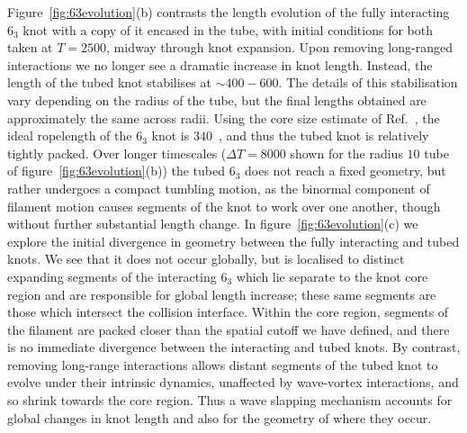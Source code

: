 Figure~\ref{fig:63evolution}(b) contrasts the length evolution of the fully interacting $6_3$ knot with a copy of it encased in the tube, with initial conditions for both taken at $T=2500$, midway through knot expansion. Upon removing long-ranged interactions we no longer see a dramatic increase in knot length. Instead, the length of the tubed knot stabilises at $\sim 400- 600$. The details of this stabilisation vary depending on the radius of the tube, but the final lengths obtained are approximately the same across radii. Using the core size estimate of Ref.~\citep{Maucher2017}, the ideal ropelength of the $6_3$ knot is $340$~\citep{Cantarella2011}, and thus the tubed knot is relatively tightly packed. Over longer timescales ($\Delta T=8000$ shown for the radius $10$ tube of figure~\ref{fig:63evolution}(b)) the tubed $6_3$ does not reach a fixed geometry, but rather undergoes a compact tumbling motion, as the binormal component of filament motion causes segments of the knot to work over one another, though without further substantial length change. In figure~\ref{fig:63evolution}(c) we explore the initial divergence in geometry between the fully interacting and tubed knots. We see that it does not occur globally, but is localised to distinct expanding segments of the interacting $6_3$ which lie separate to the knot core region and are responsible for global length increase; these same segments are those which intersect the collision interface. Within the core region, segments of the filament are packed closer than the spatial cutoff we have defined, and there is no immediate divergence between the interacting and tubed knots. By contrast, removing long-range interactions allows distant segments of the tubed knot to evolve under their intrinsic dynamics, unaffected by wave-vortex interactions, and so shrink towards the core region. Thus a wave slapping mechanism accounts for global changes in knot length and also for the geometry of where they occur. 

